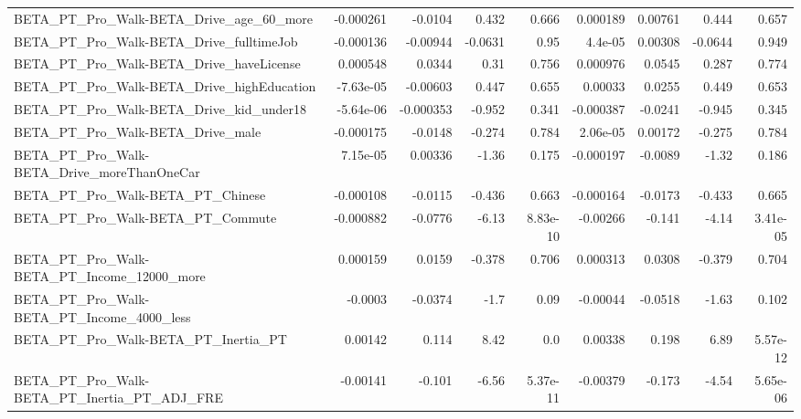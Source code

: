 \begin{tabular}{lrrrrrrrr}
BETA\_PT\_Pro\_Walk-BETA\_Drive\_age\_60\_more            &   -0.000261 &      -0.0104 &    0.432 &    0.666 &   0.000189 &     0.00761 &        0.444 &         0.657 \\
BETA\_PT\_Pro\_Walk-BETA\_Drive\_fulltimeJob            &   -0.000136 &     -0.00944 &  -0.0631 &     0.95 &    4.4e-05 &     0.00308 &      -0.0644 &         0.949 \\
BETA\_PT\_Pro\_Walk-BETA\_Drive\_haveLicense            &    0.000548 &       0.0344 &     0.31 &    0.756 &   0.000976 &      0.0545 &        0.287 &         0.774 \\
BETA\_PT\_Pro\_Walk-BETA\_Drive\_highEducation          &   -7.63e-05 &     -0.00603 &    0.447 &    0.655 &    0.00033 &      0.0255 &        0.449 &         0.653 \\
BETA\_PT\_Pro\_Walk-BETA\_Drive\_kid\_under18            &   -5.64e-06 &    -0.000353 &   -0.952 &    0.341 &  -0.000387 &     -0.0241 &       -0.945 &         0.345 \\
BETA\_PT\_Pro\_Walk-BETA\_Drive\_male                   &   -0.000175 &      -0.0148 &   -0.274 &    0.784 &   2.06e-05 &     0.00172 &       -0.275 &         0.784 \\
BETA\_PT\_Pro\_Walk-BETA\_Drive\_moreThanOneCar         &    7.15e-05 &      0.00336 &    -1.36 &    0.175 &  -0.000197 &     -0.0089 &        -1.32 &         0.186 \\
BETA\_PT\_Pro\_Walk-BETA\_PT\_Chinese                   &   -0.000108 &      -0.0115 &   -0.436 &    0.663 &  -0.000164 &     -0.0173 &       -0.433 &         0.665 \\
BETA\_PT\_Pro\_Walk-BETA\_PT\_Commute                   &   -0.000882 &      -0.0776 &    -6.13 & 8.83e-10 &   -0.00266 &      -0.141 &        -4.14 &      3.41e-05 \\
BETA\_PT\_Pro\_Walk-BETA\_PT\_Income\_12000\_more         &    0.000159 &       0.0159 &   -0.378 &    0.706 &   0.000313 &      0.0308 &       -0.379 &         0.704 \\
BETA\_PT\_Pro\_Walk-BETA\_PT\_Income\_4000\_less          &     -0.0003 &      -0.0374 &     -1.7 &     0.09 &   -0.00044 &     -0.0518 &        -1.63 &         0.102 \\
BETA\_PT\_Pro\_Walk-BETA\_PT\_Inertia\_PT                &     0.00142 &        0.114 &     8.42 &      0.0 &    0.00338 &       0.198 &         6.89 &      5.57e-12 \\
BETA\_PT\_Pro\_Walk-BETA\_PT\_Inertia\_PT\_ADJ\_FRE        &    -0.00141 &       -0.101 &    -6.56 & 5.37e-11 &   -0.00379 &      -0.173 &        -4.54 &      5.65e-06 \\

\end{tabular}
